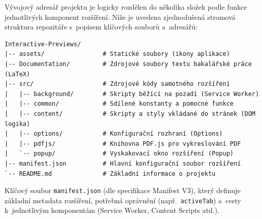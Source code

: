\documentclass[a4paper,12pt]{article}
\begin{document}
\fi									%




\listofappendices


\backmatter%

\label{priloha:struktura}

Vývojový adresář projektu je logicky rozdělen do několika složek podle funkce jednotlivých komponent rozšíření. Níže je uvedena zjednodušená stromová struktura repozitáře s~popisem klíčových souborů a~adresářů:

\begin{lstlisting}[language={}, numbers=none, basicstyle=\ttfamily\small]
Interactive-Previews/
|-- assets/                # Statické soubory (ikony aplikace)
|-- Documentation/         # Zdrojové soubory textu bakalářské práce (LaTeX)
|-- src/                   # Zdrojové kódy samotného rozšíření
|   |-- background/        # Skripty běžící na pozadí (Service Worker)
|   |-- common/            # Sdílené konstanty a pomocné funkce
|   |-- content/           # Skripty a styly vkládané do stránek (DOM logika)
|   |-- options/           # Konfigurační rozhraní (Options)
|   |-- pdfjs/             # Knihovna PDF.js pro vykreslování PDF
|   `-- popup/             # Vyskakovací okno rozšíření (Popup)
|-- manifest.json          # Hlavní konfigurační soubor rozšíření
`-- README.md              # Základní informace o projektu
\end{lstlisting}

\label{priloha:manifest}

Klíčový soubor \texttt{manifest.json} (dle specifikace Manifest V3), který definuje základní metadata rozšíření, potřebná oprávnění (např.~\texttt{activeTab}) a~cesty k~jednotlivým komponentám (Service Worker, Content Scripts atd.).
\end{document}

